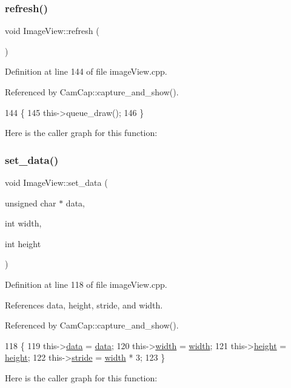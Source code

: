 \subsubsection{\texorpdfstring{refresh()}{refresh()}}
{\footnotesize\ttfamily void Image\+View\+::refresh (\begin{DoxyParamCaption}{ }\end{DoxyParamCaption})}



Definition at line 144 of file image\+View.\+cpp.



Referenced by Cam\+Cap\+::capture\+\_\+and\+\_\+show().


\begin{DoxyCode}
144                         \{
145     this->queue\_draw();
146 \}
\end{DoxyCode}
Here is the caller graph for this function\+:
\mbox{\label{class_image_view_a34baa17952c6cbc4374f1bb6bdbbd757}} 
\subsubsection{\texorpdfstring{set\+\_\+data()}{set\_data()}}
{\footnotesize\ttfamily void Image\+View\+::set\+\_\+data (\begin{DoxyParamCaption}\item[{unsigned char $\ast$}]{data,  }\item[{int}]{width,  }\item[{int}]{height }\end{DoxyParamCaption})}



Definition at line 118 of file image\+View.\+cpp.



References data, height, stride, and width.



Referenced by Cam\+Cap\+::capture\+\_\+and\+\_\+show().


\begin{DoxyCode}
118                                                                     \{
119     this->\hyperlink{class_image_view_aafc2f72cb5d3cbc5f23eb303b30982da}{data} = \hyperlink{class_image_view_aafc2f72cb5d3cbc5f23eb303b30982da}{data};
120     this->\hyperlink{class_image_view_a5a491c5256173430d4b16d9abea80727}{width} = \hyperlink{class_image_view_a5a491c5256173430d4b16d9abea80727}{width};
121     this->\hyperlink{class_image_view_a3e4a6ddf0a10ae710405cdd6e73924f6}{height} = \hyperlink{class_image_view_a3e4a6ddf0a10ae710405cdd6e73924f6}{height};
122     this->\hyperlink{class_image_view_aee8be5a0041dbc9c04cdc439d08cc3df}{stride} = \hyperlink{class_image_view_a5a491c5256173430d4b16d9abea80727}{width} * 3;
123 \}
\end{DoxyCode}
Here is the caller graph for this function\+:


